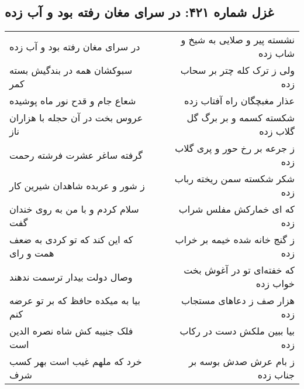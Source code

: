 \begin{center}
\section*{غزل شماره ۴۲۱: در سرای مغان رفته بود و آب زده}
\label{sec:sh421}
\begin{longtable}{l p{0.5cm} r}
در سرای مغان رفته بود و آب زده
&&
نشسته پیر و صلایی به شیخ و شاب زده
\\
سبوکشان همه در بندگیش بسته کمر
&&
ولی ز ترک کله چتر بر سحاب زده
\\
شعاع جام و قدح نور ماه پوشیده
&&
عذار مغبچگان راه آفتاب زده
\\
عروس بخت در آن حجله با هزاران ناز
&&
شکسته کسمه و بر برگ گل گلاب زده
\\
گرفته ساغر عشرت فرشته رحمت
&&
ز جرعه بر رخ حور و پری گلاب زده
\\
ز شور و عربده شاهدان شیرین کار
&&
شکر شکسته سمن ریخته رباب زده
\\
سلام کردم و با من به روی خندان گفت
&&
که ای خمارکش مفلس شراب زده
\\
که این کند که تو کردی به ضعف همت و رای
&&
ز گنج خانه شده خیمه بر خراب زده
\\
وصال دولت بیدار ترسمت ندهند
&&
که خفته‌ای تو در آغوش بخت خواب زده
\\
بیا به میکده حافظ که بر تو عرضه کنم
&&
هزار صف ز دعاهای مستجاب زده
\\
فلک جنیبه کش شاه نصره الدین است
&&
بیا ببین ملکش دست در رکاب زده
\\
خرد که ملهم غیب است بهر کسب شرف
&&
ز بام عرش صدش بوسه بر جناب زده
\\
\end{longtable}
\end{center}
